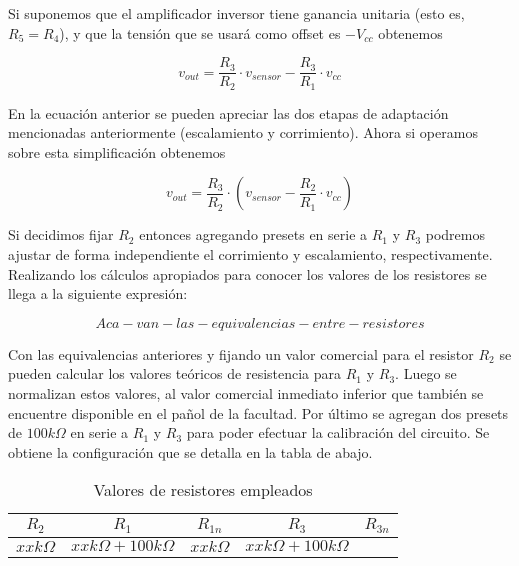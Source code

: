 Si suponemos que el amplificador inversor tiene ganancia unitaria (esto es, $R_5=R_4$), y que la tensión que se usará como offset es $-V_{cc}$ obtenemos

\begin{equation}
    v_{out}= \frac{R_3}{R_2} \cdot v_{sensor}  - \frac{R_3}{R_1} \cdot v_{cc} 
    \label{fig:EJ6_ecuacion_sistema2} 
\end{equation}

En la ecuación anterior se pueden apreciar las dos etapas de adaptación mencionadas anteriormente (escalamiento y corrimiento). Ahora si operamos sobre esta simplificación obtenemos

\begin{equation}
    v_{out}= \frac{R_3}{R_2} \cdot \left( v_{sensor} - \frac{R_2}{R_1} \cdot v_{cc} \right)
    \label{fig:EJ6_ecuacion_sistema_simplificada_final} 
\end{equation}

Si decidimos fijar $R_2$ entonces agregando presets en serie a $R_1$ y $R_3$ podremos ajustar de forma independiente el corrimiento y escalamiento, respectivamente.
Realizando los c\'alculos apropiados para conocer los valores de los resistores se llega a la siguiente expresi\'on:

\begin{equation}
    Aca-van-las-equivalencias-entre-resistores
    \label{fig:EJ6_ecuacion_resistores}
\end{equation}

Con las equivalencias anteriores y fijando un valor comercial para el resistor $R_2$ se pueden calcular los valores teóricos de resistencia para $R_1$ y $R_3$.
  Luego se normalizan estos valores, al valor comercial inmediato inferior que tambi\'en se encuentre disponible en el pa\~nol de la facultad.
  Por \'ultimo se agregan dos presets de $100k\Omega$ en serie a $R_1$ y $R_3$ para poder efectuar la calibraci\'on del circuito. Se obtiene la configuraci\'on que se detalla en la tabla de abajo.

  \begin{table}[H]
	\begin{center}
		\begin{tabular}{c c c c c}
		$R_2$ & $R_1$ & $R_{1n}$ & $R_3$ & $R_{3n}$ \\
		\hline
		$xx k\Omega$ & $xx k\Omega + 100 k\Omega$ & $xx k\Omega$ & $xx k\Omega + 100 k\Omega$
		\end{tabular}
		
		\caption{Valores de resistores empleados}
	\end{center}
\end{table}


